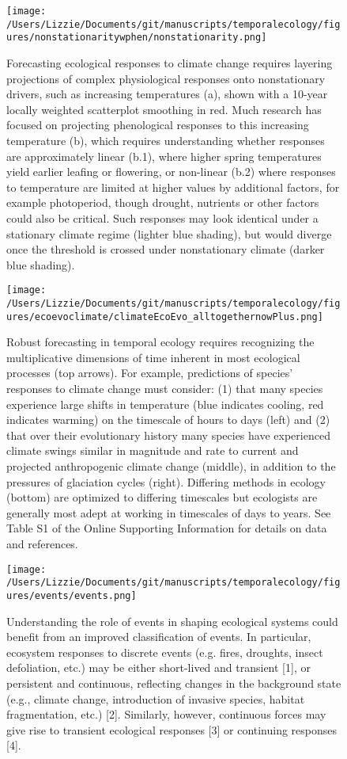 \documentclass[11pt,a4paper,oneside]{article}
\begin{document}
\newpage
\begin{figure}[h!]
\centering
\noindent \texttt{[image: /Users/Lizzie/Documents/git/manuscripts/temporalecology/figures/nonstationaritywphen/nonstationarity.png]}
\caption{Forecasting ecological responses to climate change requires layering projections of complex physiological responses onto nonstationary drivers, such as increasing temperatures (a), shown with a 10-year locally weighted scatterplot smoothing in red. Much research has focused on projecting phenological responses to this increasing temperature (b), which requires understanding whether responses are approximately linear (b.1), where higher spring temperatures yield earlier leafing or flowering, or non-linear (b.2) where responses to temperature are limited at higher values by additional factors, for example photoperiod, though drought, nutrients or other factors could also be critical. Such responses may look identical under a stationary climate regime (lighter blue shading), but would diverge once the threshold is crossed under nonstationary climate (darker blue shading).}
\end{figure}

\newpage
\begin{figure}[h!]
\centering
\noindent \texttt{[image: /Users/Lizzie/Documents/git/manuscripts/temporalecology/figures/ecoevoclimate/climateEcoEvo\_alltogethernowPlus.png]}
\caption{Robust forecasting in temporal ecology requires recognizing the multiplicative dimensions of time inherent in most ecological processes (top arrows). For example, predictions of species' responses to climate change must consider: (1) that many species experience large shifts in temperature (blue indicates cooling, red indicates warming) on the timescale of hours to days (left) and (2) that over their evolutionary history many species have experienced climate swings similar in magnitude and rate to current and projected anthropogenic climate change (middle), in addition to the pressures of glaciation cycles (right). Differing methods in ecology (bottom) are optimized to differing timescales but ecologists are generally most adept at working in timescales of days to years. See Table S1 of the Online Supporting Information for details on data and references.}
\end{figure}

\newpage
\begin{figure}[h!]
\centering
\noindent \texttt{[image: /Users/Lizzie/Documents/git/manuscripts/temporalecology/figures/events/events.png]}
\caption{Understanding the role of events in shaping ecological systems could benefit from an improved classification of events. In particular, ecosystem responses to discrete events (e.g. fires, droughts, insect defoliation, etc.) may be either short-lived and transient [1], or persistent and continuous, reflecting changes in the background state (e.g., climate change, introduction of invasive species, habitat fragmentation, etc.) [2]. Similarly, however, continuous forces may give rise to transient ecological responses [3] or continuing responses [4]. }
\end{figure}
\end{document}
